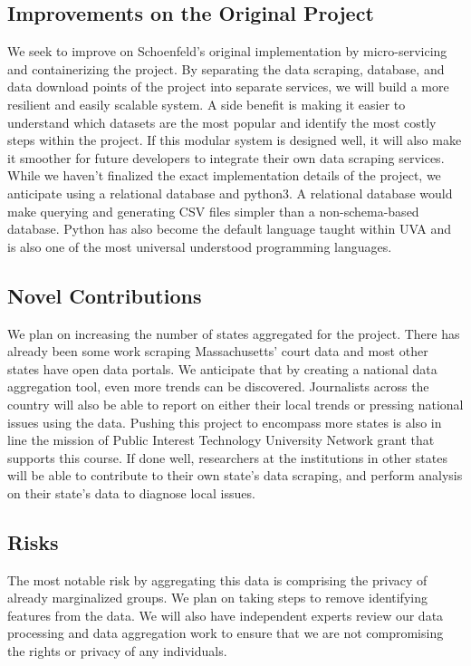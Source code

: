 \documentclass[12pt]{article}
\begin{document}
\subsection{Improvements on the Original Project}

\noindent We seek to improve on Schoenfeld's original implementation by micro-servicing and containerizing the project. 
By separating the data scraping, database, and data download points of the project into separate services, we will build a more resilient and easily scalable system.
A side benefit is making it easier to understand which datasets are the most popular and identify the most costly steps within the project.
If this modular system is designed well, it will also make it smoother for future developers to integrate their own data scraping services.
While we haven't finalized the exact implementation details of the project, we anticipate using a relational database and python3.
A relational database would make querying and generating CSV files simpler than a non-schema-based database.
Python has also become the default language taught within UVA and is also one of the most universal understood programming languages.

\subsection{Novel Contributions}

\noindent We plan on increasing the number of states aggregated for the project. 
There has already been some work scraping Massachusetts' court data and most other states have open data portals.
We anticipate that by creating a national data aggregation tool, even more trends can be discovered.
Journalists across the country will also be able to report on either their local trends or pressing national issues using the data.
Pushing this project to encompass more states is also in line the mission of Public Interest Technology University Network grant that supports this course.
If done well, researchers at the institutions in other states will be able to contribute to their own state's data scraping, and perform analysis on their state's data to diagnose local issues.

\subsection{Risks}

\noindent The most notable risk by aggregating this data is comprising the privacy of already marginalized groups.
We plan on taking steps to remove identifying features from the data.
We will also have independent experts review our data processing and data aggregation work to ensure that we are not compromising the rights or privacy of any individuals.
\end{document}
